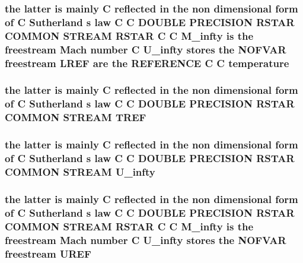 \hypertarget{stream_8com_a46fb926ed83966d981ba4bbfd791eaed}{
\subsubsection[{temperature}]{\setlength{\rightskip}{0pt plus 5cm}the latter is mainly C reflected in the non dimensional form of C Sutherland s law C C D\-O\-U\-B\-L\-E P\-R\-E\-C\-I\-S\-I\-O\-N R\-S\-T\-A\-R C\-O\-M\-M\-O\-N S\-T\-R\-E\-A\-M R\-S\-T\-A\-R C C {\bf M\-\_\-infty} is the freestream Mach number C {\bf U\-\_\-infty} stores the N\-O\-F\-V\-A\-R freestream {\bf L\-R\-E\-F} {\bf are} the R\-E\-F\-E\-R\-E\-N\-C\-E C C temperature}}\label{stream_8com_a46fb926ed83966d981ba4bbfd791eaed}
\hypertarget{stream_8com_a8c4a60ca1b033fbd4e2cadaf15146ca5}{
\subsubsection[{T\-R\-E\-F}]{\setlength{\rightskip}{0pt plus 5cm}the latter is mainly C reflected in the non dimensional form of C Sutherland s law C C D\-O\-U\-B\-L\-E P\-R\-E\-C\-I\-S\-I\-O\-N R\-S\-T\-A\-R C\-O\-M\-M\-O\-N S\-T\-R\-E\-A\-M T\-R\-E\-F}}\label{stream_8com_a8c4a60ca1b033fbd4e2cadaf15146ca5}
\hypertarget{stream_8com_a396c12357ce60c0aaccd169e136b5d9a}{
\subsubsection[{U\-\_\-infty}]{\setlength{\rightskip}{0pt plus 5cm}the latter is mainly C reflected in the non dimensional form of C Sutherland s law C C D\-O\-U\-B\-L\-E P\-R\-E\-C\-I\-S\-I\-O\-N R\-S\-T\-A\-R C\-O\-M\-M\-O\-N S\-T\-R\-E\-A\-M U\-\_\-infty}}\label{stream_8com_a396c12357ce60c0aaccd169e136b5d9a}
\hypertarget{stream_8com_ab0954e3210109eba37b309fef6a66996}{
\subsubsection[{U\-R\-E\-F}]{\setlength{\rightskip}{0pt plus 5cm}the latter is mainly C reflected in the non dimensional form of C Sutherland s law C C D\-O\-U\-B\-L\-E P\-R\-E\-C\-I\-S\-I\-O\-N R\-S\-T\-A\-R C\-O\-M\-M\-O\-N S\-T\-R\-E\-A\-M R\-S\-T\-A\-R C C {\bf M\-\_\-infty} is the freestream Mach number C {\bf U\-\_\-infty} stores the N\-O\-F\-V\-A\-R freestream U\-R\-E\-F}}\label{stream_8com_ab0954e3210109eba37b309fef6a66996}
